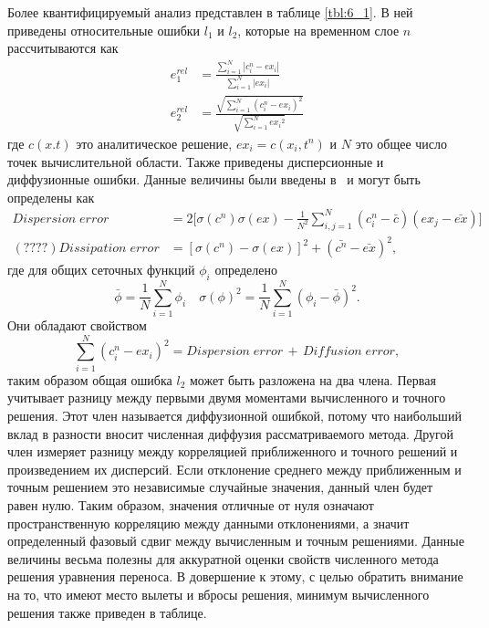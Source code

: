 Более квантифицируемый анализ представлен в таблице \ref{tbl:6_1}. В ней приведены относительные ошибки $l_1$ и $l_2$, которые на временном слое $n$ рассчитываются как
%
\begin{align}
\label{eq:equation6_1}
e_1^{rel}&=\frac{\sum_{i=1}^{N}|c_i^n-ex_i|}{\sum_{i=1}^{N}|ex_i|}\\
\label{eq:equation6_2}
e_2^{rel}&=\frac{\sqrt{\sum_{i=1}^{N}{(c_i^n-ex_i)}^2}}{\sqrt{\sum_{i=1}^{N}{ex_i}^2}}
\end{align}
%
где $c(x.t)$ это аналитическое решение, $ex_i=c(x_i,t^n)$ и $N$ это общее число точек вычислительной области. Также приведены дисперсионные и диффузионные ошибки. Данные величины были введены в~\cite{A69} и могут быть определены как
%
\begin{align}
	\label{eq:equation6_3}
   Dispersion\; error&=2\Big[\sigma(c^n)\sigma(ex)-\frac{1}{N^2}\sum_{i,j=1}^{N}(c_i^n-\bar{c})(ex_j-\bar{ex})\Big]\nonumber \\ 
    (\mathbf{????})Dissipation\;error&=[\sigma(c^n)-\sigma(ex)]^2+(\bar{c^n}-\bar{ex})^2,
\end{align}
%
где для общих сеточных функций $\phi_i$ определено
%
\begin{equation}
\label{eq:equation6_4}
\bar{\phi}=\frac{1}{N}\sum_{i=1}^{N}\phi_i\quad\sigma(\phi)^2=\frac{1}{N}\sum_{i=1}^{N}(\phi_i-\bar{\phi})^2.
\end{equation}
%
Они обладают свойством
%
\begin{equation}
\label{eq:equation6_5}
\sum_{i=1}^{N}(c_i^n-ex_i)^2=Dispersion\;error\,+\,Diffusion\;error,
\end{equation}
%
таким образом общая ошибка $l_2$ может быть разложена на два члена. Первая учитывает разницу между первыми двумя моментами вычисленного и точного решения. Этот член называется диффузионной ошибкой, потому что наибольший вклад в разности вносит численная диффузия рассматриваемого метода. Другой член измеряет разницу между корреляцией приближенного и точного решений и произведением их дисперсий. Если отклонение среднего между приближенным и точным решением это независимые случайные значения, данный член будет равен нулю. Таким образом, значения отличные от нуля означают пространственную корреляцию между данными отклонениями, а значит определенный фазовый сдвиг между вычисленным и точным решениями. Данные величины весьма полезны для аккуратной оценки свойств численного метода решения уравнения переноса. В довершение к этому, с целью обратить внимание на то, что имеют место вылеты и вбросы решения, минимум вычисленного решения также приведен в таблице.
